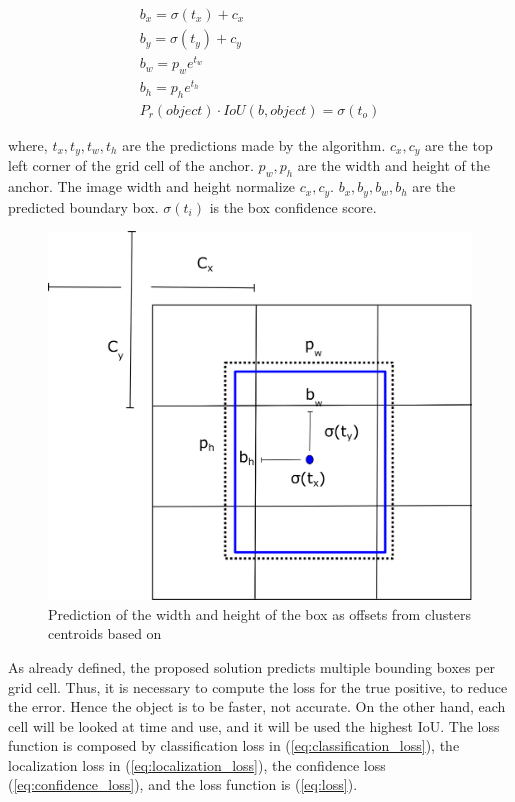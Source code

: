     
    \begin{equation}
    \label{eq:bound}
    \begin{aligned}
        b_x = \sigma(t_x) + c_x \\
        b_y = \sigma(t_y) + c_y \\
        b_w = p_we^{t_w} \\
        b_h = p_he^{t_h} \\
        P_r(object)\cdot IoU(b,object) = \sigma(t_o)
    \end{aligned}
    \end{equation}

where, $t_x, t_y, t_w, t_h$ are the predictions made by the algorithm. 
$c_x, c_y$ are the top left corner of the grid cell of the anchor.
$p_w, p_h$ are the width and height of the anchor. 
The image width and height normalize $ c_x, c_y$. 
$b_x, b_y, b_w, b_h$ are the predicted boundary box. 
$\sigma(t_i)$ is the box confidence score.

\begin{figure}[H]
\centering
\includegraphics[scale=0.5]{imagens/anchor.png}
\caption{Prediction of the width and height of the box as offsets from clusters centroids based on \cite{redmon2017yolo9000}}
\label{fig:anchor}
\end{figure}

As already defined, the proposed solution predicts multiple bounding boxes per grid cell. Thus, it is necessary to compute the loss for the true positive, to reduce the error. Hence the object is to be faster, not accurate. On the other hand, each cell will be looked at time and use, and it will be used the highest IoU. The loss function is composed by classification loss in (\ref{eq:classification_loss}), the localization loss in (\ref{eq:localization_loss}), the confidence loss (\ref{eq:confidence_loss}), and the loss function is (\ref{eq:loss}). 

